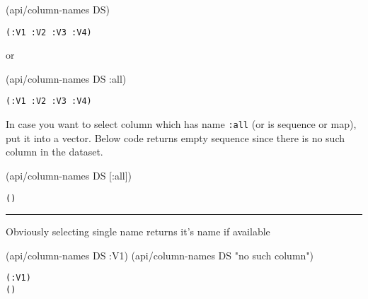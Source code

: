 \documentclass[]{article}
\newenvironment{Shaded}{\begin{snugshade}}{\end{snugshade}}
\newcommand{\StringTok}[1]{\textcolor[rgb]{0.31,0.60,0.02}{#1}}
\newcommand{\AttributeTok}[1]{\textcolor[rgb]{0.77,0.63,0.00}{#1}}
\newcommand{\NormalTok}[1]{#1}
\begin{document}
\begin{Shaded}
\begin{Highlighting}[]
\NormalTok{(api/column-names DS)}
\end{Highlighting}
\end{Shaded}

\begin{verbatim}
(:V1 :V2 :V3 :V4)
\end{verbatim}

or

\begin{Shaded}
\begin{Highlighting}[]
\NormalTok{(api/column-names DS }\AttributeTok{:all}\NormalTok{)}
\end{Highlighting}
\end{Shaded}

\begin{verbatim}
(:V1 :V2 :V3 :V4)
\end{verbatim}

In case you want to select column which has name \texttt{:all} (or is
sequence or map), put it into a vector. Below code returns empty
sequence since there is no such column in the dataset.

\begin{Shaded}
\begin{Highlighting}[]
\NormalTok{(api/column-names DS [}\AttributeTok{:all}\NormalTok{])}
\end{Highlighting}
\end{Shaded}

\begin{verbatim}
()
\end{verbatim}

\begin{center}\rule{0.5\linewidth}{0.5pt}\end{center}

Obviously selecting single name returns it's name if available

\begin{Shaded}
\begin{Highlighting}[]
\NormalTok{(api/column-names DS }\AttributeTok{:V1}\NormalTok{)}
\NormalTok{(api/column-names DS }\StringTok{"no such column"}\NormalTok{)}
\end{Highlighting}
\end{Shaded}

\begin{verbatim}
(:V1)
()
\end{verbatim}
\end{document}

